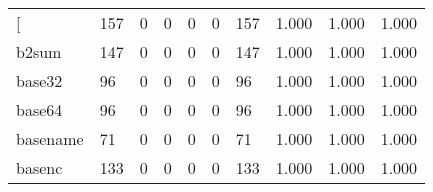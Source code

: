 \begin{longtable}{lp{2.0cm}p{2.0cm}p{2.0cm}p{2.0cm}p{2.0cm}p{2.0cm}p{2.0cm}p{2.0cm}p{2.0cm}}
\bottomrule
\endlastfoot
{[}         &                    157 &                                             0 &                                            0 &                                           0 &                                            0 &                                        157 &                                1.000 &                                  1.000 &                                1.000 \\
b2sum     &                    147 &                                             0 &                                            0 &                                           0 &                                            0 &                                        147 &                                1.000 &                                  1.000 &                                1.000 \\
base32    &                     96 &                                             0 &                                            0 &                                           0 &                                            0 &                                         96 &                                1.000 &                                  1.000 &                                1.000 \\
base64    &                     96 &                                             0 &                                            0 &                                           0 &                                            0 &                                         96 &                                1.000 &                                  1.000 &                                1.000 \\
basename  &                     71 &                                             0 &                                            0 &                                           0 &                                            0 &                                         71 &                                1.000 &                                  1.000 &                                1.000 \\
basenc    &                    133 &                                             0 &                                            0 &                                           0 &                                            0 &                                        133 &                                1.000 &                                  1.000 &                                1.000 \\

\end{longtable}
